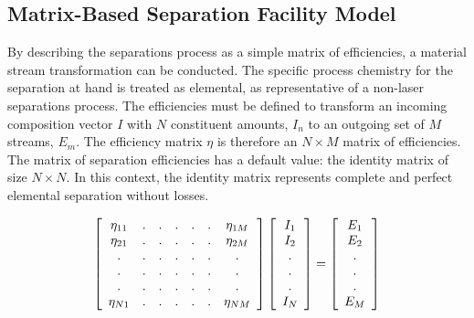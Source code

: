 \subsection{Matrix-Based Separation Facility Model}

By describing the separations process as a simple matrix of efficiencies, a  
material stream transformation can be conducted. The specific process chemistry 
for the separation at hand is treated as elemental, as representative of a 
  non-laser separations process. The efficiencies must be defined to transform 
  an incoming composition vector $I$ with $N$ constituent amounts, $I_n$ to an 
  outgoing set of $M$ streams, $E_m$. The efficiency matrix $\eta$ is therefore 
  an $N\times M$ matrix of efficiencies. The matrix of separation efficiencies 
  has a default value: the identity matrix of size $N\times N$. In this 
  context, the identity matrix represents complete and perfect elemental 
  separation without losses. 

\begin{align}
  \left[
    \begin{array}{c c c c c c c}
      \eta_{11} & . & . & . & . & . & \eta_{1M} \\
      \eta_{21} & . & . & . & . & . & \eta_{2M} \\
      . & . & . & . & . & . & . \\
      . & . & . & . & . & . & . \\
      . & . & . & . & . & . & . \\
      \eta_{N1} & .  & . & . & . & . & \eta_{NM} \\
    \end{array}
    \right]
  \left[
    \begin{array}{c}
      I_1\\
      I_2\\
      . \\
      . \\
      . \\
      I_N\\
    \end{array}
    \right]
    =
    \left[
      \begin{array}{ c }
        E_1\\
        E_2\\
        .\\
        .\\
        .\\
        E_M\\
      \end{array}
      \right]
\label{defaultsep}
\end{align}

